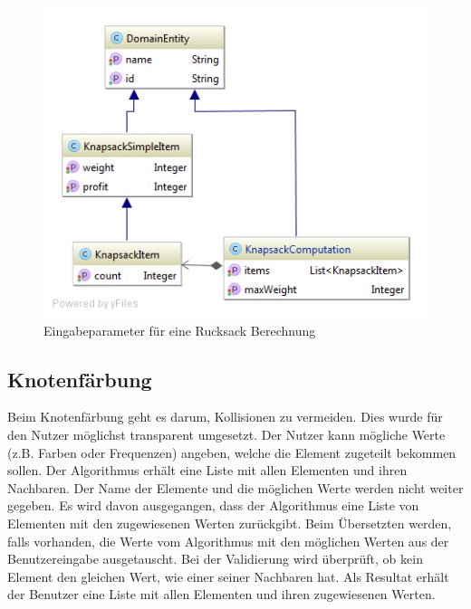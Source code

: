 \begin{figure}[h]
\centering
\includegraphics[scale=0.5]{images/probleme/knapsack.png}
\caption[Eingabeparameter für eine Rucksack Berechnung]{Eingabeparameter für eine Rucksack Berechnung \selfmade{}}
\label{fig:knapsack_input}
\end{figure}

\FloatBarrier

%
%
%
%

\subsection{Knotenfärbung}
Beim Knotenfärbung geht es darum, Kollisionen zu vermeiden. Dies wurde für den Nutzer möglichst transparent umgesetzt. Der Nutzer kann mögliche Werte (z.B. Farben oder 
Frequenzen) angeben, welche die Element zugeteilt bekommen sollen. Der Algorithmus erhält eine Liste mit allen Elementen und ihren Nachbaren. Der Name der Elemente und die möglichen 
Werte werden nicht weiter gegeben. Es wird davon ausgegangen, dass der Algorithmus eine Liste von Elementen mit den zugewiesenen Werten zurückgibt. Beim Übersetzten werden, falls 
vorhanden, die Werte vom Algorithmus mit den möglichen Werten aus der Benutzereingabe ausgetauscht. Bei der Validierung wird überprüft, ob kein Element den gleichen Wert, wie einer 
seiner Nachbaren hat. Als Resultat erhält der Benutzer eine Liste mit allen Elementen und ihren zugewiesenen Werten.

